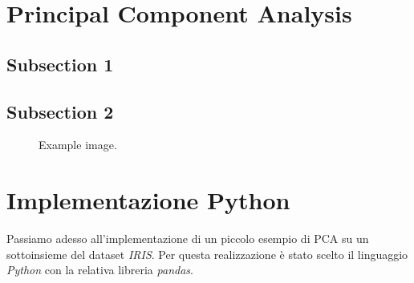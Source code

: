 \documentclass[12pt]{article} %
\begin{document}

\tableofcontents %

\newpage %


\section{Principal Component Analysis} %

	\lipsum[1]
	
	\subsection{Subsection 1} %

		\lipsum[1] %

	\subsection{Subsection 2} %

		\lipsum[2] %
		\begin{figure}[H] %
			\caption{Example image.}
			\label{fig:speciation}
		\end{figure}

\section{Implementazione Python} %

	Passiamo adesso all'implementazione di un piccolo esempio di \ac{PCA} su un sottoinsieme del dataset \emph{IRIS}. Per questa realizzazione è stato scelto il linguaggio \emph{Python} con la relativa libreria \emph{pandas}.
\end{document}

